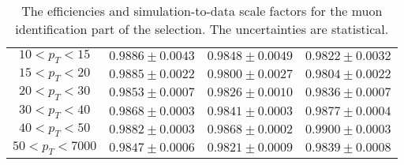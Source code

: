\begin{table}[!ht]
\begin{center}
\begin{tabular}{c|c|c|c}
\hline 
$ 10 < p_T <  15$ & $0.9886 \pm 0.0043$ & $0.9848 \pm 0.0049$ & $0.9822 \pm 0.0032$  \\
$ 15 < p_T <  20$ & $0.9885 \pm 0.0022$ & $0.9800 \pm 0.0027$ & $0.9804 \pm 0.0022$  \\
$ 20 < p_T <  30$ & $0.9853 \pm 0.0007$ & $0.9826 \pm 0.0010$ & $0.9836 \pm 0.0007$  \\
$ 30 < p_T <  40$ & $0.9868 \pm 0.0003$ & $0.9841 \pm 0.0003$ & $0.9877 \pm 0.0004$  \\
$ 40 < p_T <  50$ & $0.9882 \pm 0.0003$ & $0.9868 \pm 0.0002$ & $0.9900 \pm 0.0003$  \\
$ 50 < p_T < 7000$ & $0.9847 \pm 0.0006$ & $0.9821 \pm 0.0009$ & $0.9839 \pm 0.0008$  \\
\hline
\end{tabular}
\caption{The efficiencies and simulation-to-data scale factors for the muon
identification part of the selection.
The uncertainties are statistical.}
\label{tab:eff_muon_id}
\end{center}
\end{table}

